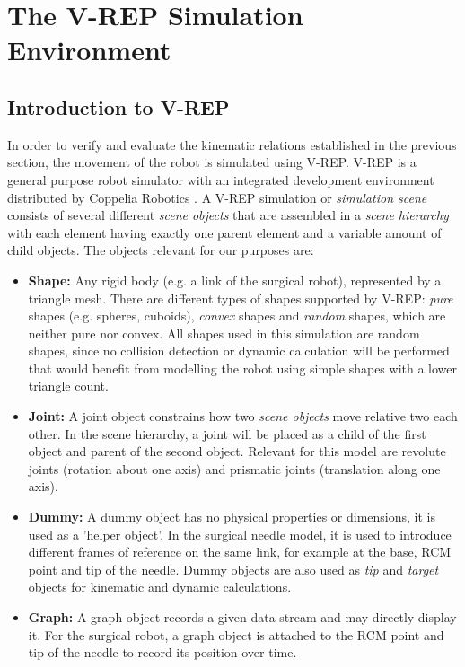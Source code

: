 \section{The V-REP Simulation Environment}

\subsection{Introduction to V-REP}

In order to verify and evaluate the kinematic relations established in the previous section, the movement of the robot is simulated using V-REP\cite{vrep}. 
V-REP is a general purpose robot simulator with an integrated development environment distributed by Coppelia Robotics \cite{coppelia}. A V-REP simulation or \textit{simulation scene} consists of several different \textit{scene objects} that are assembled in a \textit{scene hierarchy} with each element having exactly one parent element and a variable amount of child objects. The objects relevant for our purposes are: 
\begin{itemize}
\item \textbf{Shape:} Any rigid body (e.g. a link of the surgical robot), represented by a triangle mesh. There are different types of shapes supported by V-REP: \textit{pure} shapes (e.g. spheres, cuboids), \textit{convex} shapes and \textit{random} shapes, which are neither pure nor convex. All shapes used in this simulation are random shapes, since no collision detection or dynamic calculation will be performed that would benefit from modelling the robot using simple shapes with a lower triangle count.
\item \textbf{Joint:} A joint object constrains how two \textit{scene objects} move relative two each other. In the scene hierarchy, a joint will be placed as a child of the first object and parent of the second object. Relevant for this model are revolute joints (rotation about one axis) and prismatic joints (translation along one axis).
\item \textbf{Dummy:} A dummy object has no physical properties or dimensions, it is used as a 'helper object'. In the surgical needle model, it is used to introduce different frames of reference on the same link, for example at the base, RCM point and tip of the needle. Dummy objects are also used as \textit{tip} and \textit{target} objects for kinematic and dynamic calculations. 
\item \textbf{Graph:} A graph object records a given data stream and may directly display it. For the surgical robot, a graph object is attached to the RCM point and tip of the needle to record its position over time. 
\end{itemize}

